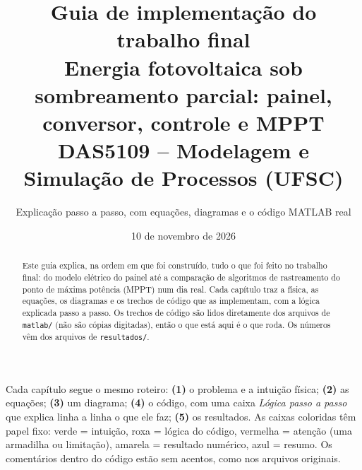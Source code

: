 \documentclass[11pt,a4paper]{article}
\title{\textbf{Guia de implementa\c{c}\~ao do trabalho final}\\[4pt]
  \large Energia fotovoltaica sob sombreamento parcial: painel, conversor, controle e MPPT\\[2pt]
  \normalsize DAS5109 -- Modelagem e Simula\c{c}\~ao de Processos (UFSC)}
\author{Explica\c{c}\~ao passo a passo, com equa\c{c}\~oes, diagramas e o c\'odigo MATLAB real}
\date{10 de novembro de 2026}
\begin{document}
\maketitle
\thispagestyle{fancy}

\begin{abstract}\noindent
Este guia explica, na ordem em que foi constru\'ido, tudo o que foi feito no trabalho final:
do modelo el\'etrico do painel at\'e a compara\c{c}\~ao de algoritmos de rastreamento do ponto de
m\'axima pot\^encia (MPPT) num dia real. Cada cap\'itulo traz a f\'isica, as equa\c{c}\~oes, os
diagramas e os trechos de c\'odigo que as implementam, com a l\'ogica explicada passo a passo.
Os trechos de c\'odigo s\~ao lidos diretamente dos arquivos de \texttt{matlab/} (n\~ao s\~ao
c\'opias digitadas), ent\~ao o que est\'a aqui \'e o que roda. Os n\'umeros v\^em dos arquivos de
\texttt{resultados/}.
\end{abstract}

\begin{tcolorbox}[colback=azul!5,colframe=azul,boxrule=0.6pt,arc=2pt,title={Como usar este guia}]
Cada cap\'itulo segue o mesmo roteiro: \textbf{(1)} o problema e a intui\c{c}\~ao f\'isica;
\textbf{(2)} as equa\c{c}\~oes; \textbf{(3)} um diagrama; \textbf{(4)} o c\'odigo, com uma caixa
\emph{L\'ogica passo a passo} que explica linha a linha o que ele faz; \textbf{(5)} os resultados.
As caixas coloridas t\^em papel fixo: verde = intui\c{c}\~ao, roxa = l\'ogica do c\'odigo,
vermelha = aten\c{c}\~ao (uma armadilha ou limita\c{c}\~ao), amarela = resultado num\'erico,
azul = resumo. Os coment\'arios dentro do c\'odigo est\~ao sem acentos, como nos arquivos
originais.
\end{tcolorbox}

\tableofcontents
\listoffigures

\clearpage














\end{document}

